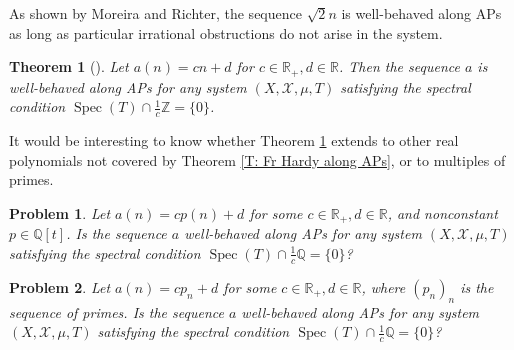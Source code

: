 \documentclass[11pt]{amsart}
\newtheorem{theorem}[lemma]{Theorem}
\newtheorem{problem}{Problem}
\theoremstyle{definition}
\newcommand{\Q}{{\mathbb Q}}
\newcommand{\R}{{\mathbb R}}
\newcommand{\Z}{{\mathbb Z}}
\newcommand{\CX}{{\mathcal X}}
\newcommand{\1}{{\mathbf{1}}}
\DeclareMathOperator{\spec}{Spec}
\begin{document}
As shown by Moreira and Richter, the sequence $\sqrt{2}n$ is well-behaved along APs as long as particular irrational obstructions do not arise in the system. 
\begin{theorem}[{\cite[Theorem 2.5]{MR19}}]\label{T: MR generalized linear}
    Let $a(n) = c n + d$ for $c\in\R_+,d\in\R$. Then the sequence $a$ is well-behaved along APs for any system $(X,\CX,\mu,T)$ satisfying the spectral condition $\spec(T)\cap\frac{1}{c}\Z = \{0\}$.
\end{theorem}
 It would be interesting to know whether Theorem \ref{T: MR generalized linear} extends to other real polynomials not covered by Theorem \ref{T: Fr Hardy along APs}, or to multiples of primes.
 \begin{problem}
     Let $a(n) = c p(n) + d$ for some $c\in\R_+, d\in\R$, and nonconstant $p\in\Q[t]$. Is the sequence $a$ well-behaved along APs for any system $(X,\CX,\mu,T)$ satisfying the spectral condition $\spec(T)\cap\frac{1}{c}\Q = \{0\}$?
 \end{problem}
  \begin{problem}
     Let $a(n) = c p_n + d$ for some $c\in\R_+, d\in\R$, where $(p_n)_n$ is the sequence of primes. Is the sequence $a$ well-behaved along APs for any system $(X,\CX,\mu,T)$ satisfying the spectral condition $\spec(T)\cap\frac{1}{c}\Q = \{0\}$?
 \end{problem}
\end{document}

